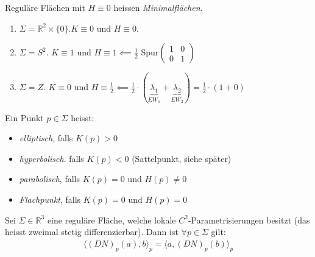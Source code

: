 \documentclass[../main.tex]{subfiles}
\begin{document}
\begin{remark}
    Reguläre Flächen mit $H \equiv 0$ heissen \emph{Minimalflächen}.
\end{remark}
\begin{examples}
    \begin{enumerate}
       \item $\Sigma = \mathbb{R}^{2} \times \{0\}. K\equiv 0 \text{ und } H\equiv 0$.
       \item $\Sigma = S^{2}$. $K \equiv 1 \text{ und } H\equiv 1 \impliedby \frac{1}{2}\text{ Spur}\begin{pmatrix}
           1 & 0 \\
           0 & 1
       \end{pmatrix}$
       \item $\Sigma = Z$. $K\equiv 0$ und $H\equiv \frac{1}{2} \impliedby \frac{1}{2} \cdot (\underbrace{\lambda_{1}}_{EW_{1}} + \underbrace{\lambda_{2}}_{EW_{2}}) = \frac{1}{2} \cdot (1 + 0)$ 
    \end{enumerate}
\end{examples}
\begin{notation}
    Ein Punkt $p\in \Sigma$ heisst:
    \begin{itemize}
        \item \emph{elliptisch}, falls $K(p) > 0$
        \item \emph{hyperbolisch}. falls $K(p) < 0$ (Sattelpunkt, siehe später)
        \item \emph{parabolisch}, falls $K(p) = 0 \text{ und } H(p) \neq 0$
        \item \emph{Flachpunkt}, falls $K(p) = 0 \text{ und } H(p) = 0$
    \end{itemize}
\end{notation}
\begin{proposition}
    Sei $\Sigma \in \mathbb{R}^{3}$ eine reguläre Fläche, welche lokale $C^{2}$-Parametrisierungen besitzt (das heisst zweimal stetig differenzierbar). 
    Dann ist $\forall p \in \Sigma$ gilt:
    \begin{align*}
        \langle (DN)_{p}(a), b\rangle_{p} = \langle a, (DN)_{p}(b)\rangle_{p}
    \end{align*}
\end{proposition}
\end{document}
